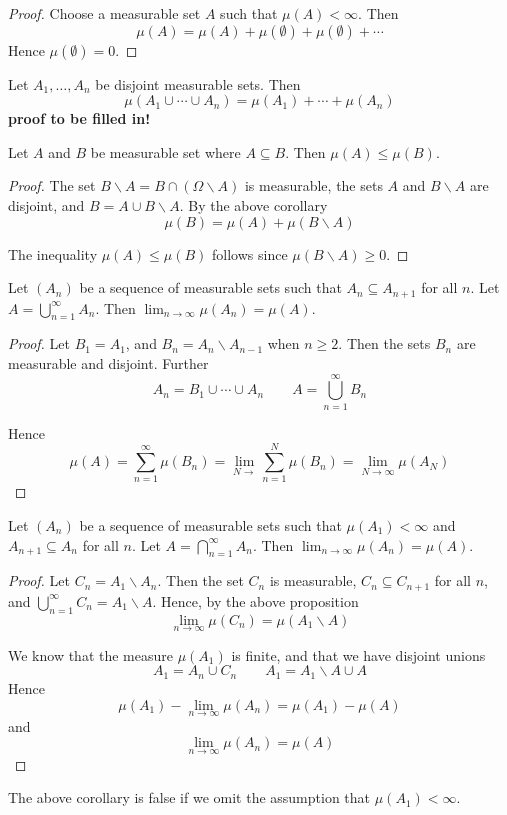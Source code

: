 \begin{proof}
Choose a measurable set $A$ such that $\mu (A)<\infty$.  Then
$$\mu (A) =  \mu (A) + \mu (\emptyset ) + \mu (\emptyset ) +\cdots$$
Hence $\mu (\emptyset ) =0$.
\end{proof}

\begin{corollary}
Let $A_1 , \ldots , A_n$ be disjoint measurable sets.  Then
$$\mu (A_1 \cup \cdots \cup A_n ) = \mu (A_1 ) + \cdots + \mu (A_n)$$
\textbf{proof to be filled in!}
\end{corollary}

\begin{corollary}
Let $A$ and $B$ be measurable set where $A\subseteq B$.  Then $\mu (A) \leq \mu (B)$.
\end{corollary}

\begin{proof}
The set $B\backslash A = B\cap (\Omega \backslash A )$ is measurable, the sets $A$ and $B\backslash A$ are disjoint, and $B = A\cup B\backslash A$.  By the above corollary
$$\mu (B) = \mu (A) + \mu (B\backslash A)$$

The inequality $\mu (A)\leq \mu (B)$ follows since $\mu (B\backslash A)\geq 0$.
\end{proof}

\begin{proposition} \label{limsub}
Let $(A_n )$ be a sequence of measurable sets such that $A_n \subseteq A_{n+1}$ for all $n$.  Let $A = \bigcup_{n=1}^\infty A_n$.  Then $\lim_{n\rightarrow \infty} \mu (A_n ) = \mu (A)$.
\end{proposition}

\begin{proof}
Let $B_1 =A_1$, and $B_n = A_n \backslash A_{n-1}$ when $n\geq 2$.  Then the sets $B_n$ are measurable and disjoint.  Further
$$A_n = B_1 \cup \cdots \cup A_n \qquad A= \bigcup_{n=1}^\infty B_n$$

Hence
$$\mu (A) = \sum_{n=1}^\infty \mu (B_n) = \lim_{N\rightarrow} \sum_{n=1}^N \mu (B_n) = \lim_{N\rightarrow \infty}\mu (A_N)$$
\end{proof}

\begin{corollary}
Let $(A_n)$ be a sequence of measurable sets such that $\mu (A_1)<\infty$ and $A_{n+1}\subseteq A_n$ for all $n$.    Let $A = \bigcap_{n=1}^\infty A_n$.  Then $\lim_{n\rightarrow \infty} \mu (A_n ) = \mu (A)$.
\end{corollary}

\begin{proof}
Let $C_n =A_1\backslash A_n$.  Then the set $C_n$ is measurable, $C_n\subseteq C_{n+1}$ for all $n$, and $\bigcup_{n=1}^\infty C_n = A_1 \backslash A$.  Hence, by the above proposition
$$\lim_{n\rightarrow \infty}\mu (C_n) = \mu (A_1 \backslash A)$$

We know that the measure $\mu (A_1)$ is finite, and that we have disjoint unions$$A_1 = A_n \cup C_n \qquad A_1 = A_1\backslash A \cup A$$
Hence
$$\mu (A_1 )- \lim_{n\rightarrow \infty} \mu (A_n) = \mu (A_1 ) - \mu (A)$$
and
$$\lim_{n\rightarrow \infty} \mu (A_n ) = \mu (A)$$
\end{proof}

The above corollary is false if we omit the assumption that $\mu (A_1)<\infty$.
